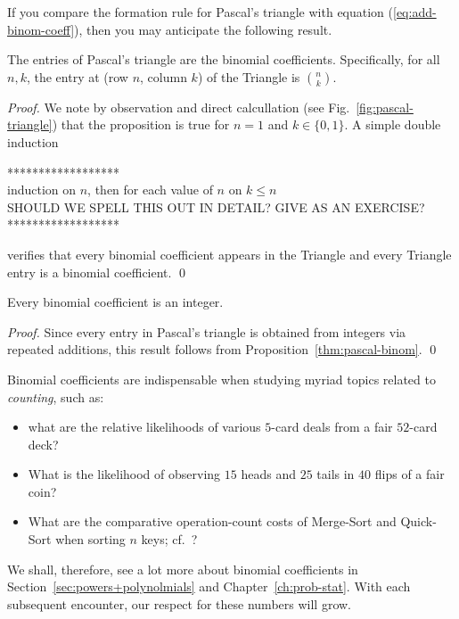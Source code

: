 If you compare the formation rule for Pascal's triangle with equation
(\ref{eq:add-binom-coeff}), then you may anticipate the following
result.


\begin{prop}
\label{thm:pascal-binom}
The entries of Pascal's triangle are the binomial coefficients.
Specifically, for all $n,k$, the entry at (row $n$, column $k$) of the
Triangle is $\displaystyle {n \choose k}$.
\end{prop}

\begin{proof}
We note by observation and direct calcullation (see
Fig.~\ref{fig:pascal-triangle}) that the proposition is true for $n =
1$ and $k \in \{0, 1\}$.  A simple double induction

\noindent
****************** \\
induction on $n$, then for each value of $n$ on $k \leq n$ \\
SHOULD WE SPELL THIS OUT IN DETAIL?  GIVE AS AN EXERCISE? \\
******************

\noindent
verifies that every binomial coefficient appears in the Triangle and
every Triangle entry is a binomial coefficient.  \qed
\end{proof}

\medskip


\begin{prop}
\label{thm:binomcoeff-integer}
Every binomial coefficient is an integer.
\end{prop}

\begin{proof}
Since every entry in Pascal's triangle is obtained from integers via
repeated additions, this result follows from
Proposition~\ref{thm:pascal-binom}.  \qed
\end{proof}

\bigskip

Binomial coefficients are indispensable when studying myriad topics
related to {\em counting}, such as:
\begin{itemize}
\item
what are the relative likelihoods of various $5$-card deals from a
fair $52$-card deck?
\item
What is the likelihood of observing $15$ {\sc head}s and $25$ {\sc
  tail}s in $40$ flips of a fair coin?
\item
What are the comparative operation-count costs of Merge-Sort and
Quick-Sort when sorting $n$ keys; cf.~\cite{CLRS}?

\end{itemize}
We shall, therefore, see a lot more about binomial coefficients in
Section~\ref{sec:powers+polynolmials} and Chapter~\ref{ch:prob-stat}.
With each subsequent encounter, our respect for these numbers will
grow.


